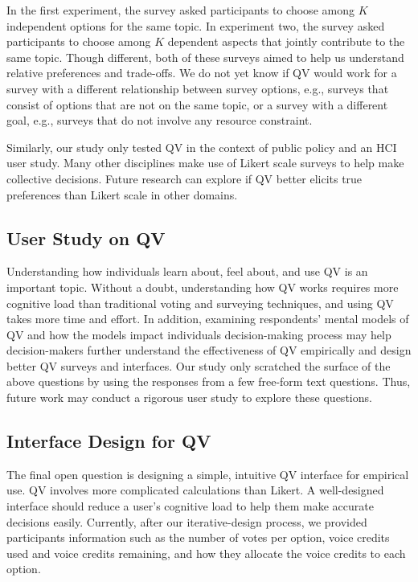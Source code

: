 In the first experiment, the survey asked participants to choose among $K$ independent options for the same topic. In experiment two, the survey asked participants to choose among $K$ dependent aspects that jointly contribute to the same topic. Though different, both of these surveys aimed to help us understand relative preferences and trade-offs. We do not yet know if QV would work for a survey with a different relationship between survey options, e.g., surveys that consist of options that are not on the same topic, or a survey with a different goal, e.g., surveys that do not involve any resource constraint.

Similarly, our study only tested QV in the context of public policy and an HCI user study. Many other disciplines make use of Likert scale surveys to help make collective decisions. Future research can explore if QV better elicits true preferences than Likert scale in other domains.

{}

\subsection{User Study on QV}
Understanding how individuals learn about, feel about, and use QV is an important topic. Without a doubt, understanding how QV works requires more cognitive load than traditional voting and surveying techniques, and using QV takes more time and effort. In addition, examining respondents' mental models of QV and how the models impact individuals decision-making process may help decision-makers further understand the effectiveness of QV empirically and design better QV surveys and interfaces. Our study only scratched the surface of the above questions by using the responses from a few free-form text questions. Thus, future work may conduct a rigorous user study to explore these questions.

\subsection{Interface Design for QV}
The final open question is designing a simple, intuitive QV interface for empirical use. QV involves more complicated calculations than Likert. A well-designed interface should reduce a user's cognitive load to help them make accurate decisions easily. Currently, after our iterative-design process, we provided participants information such as the number of votes per option, voice credits used and voice credits remaining, and how they allocate the voice credits to each option. 

